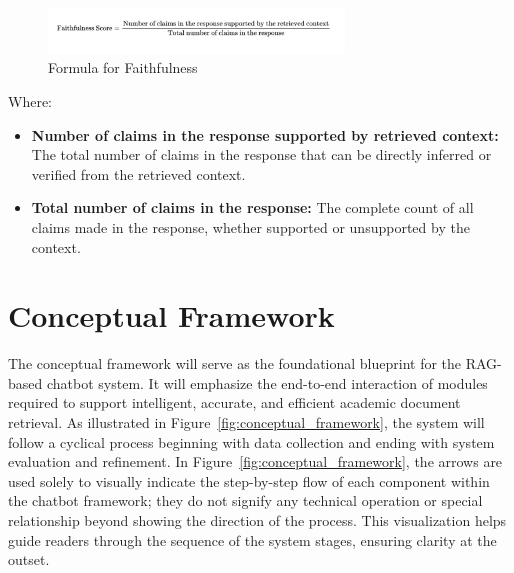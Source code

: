 \begin{refsection}

\begin{figure}[H]
\centering
\includegraphics[width=0.7\textwidth]{figures/faithfulness_formula.png}
\caption{Formula for Faithfulness}
\label{fig:faithfulness}
\end{figure}

\noindent Where:
\begin{itemize}
    \item \textbf{Number of claims in the response supported by retrieved context:} The total number of claims in the response that can be directly inferred or verified from the retrieved context.
    \item \textbf{Total number of claims in the response:} The complete count of all claims made in the response, whether supported or unsupported by the context.
\end{itemize}


\section{Conceptual Framework}

The conceptual framework will serve as the foundational blueprint for the RAG-based chatbot system. It will emphasize the end-to-end interaction of modules required to support intelligent, accurate, and efficient academic document retrieval. As illustrated in Figure~\ref{fig:conceptual_framework}, the system will follow a cyclical process beginning with data collection and ending with system evaluation and refinement.
In Figure~\ref{fig:conceptual_framework}, the arrows are used solely to visually indicate the step-by-step flow of each component within the chatbot framework; they do not signify any technical operation or special relationship beyond showing the direction of the process. 
\newpage
\clearpage
This visualization helps guide readers through the sequence of the system stages, ensuring clarity at the outset.


\end{refsection}
